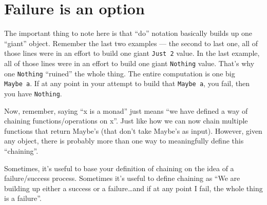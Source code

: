 \documentclass[]{article}
\begin{document}
\section{Failure is an option}\label{failure-is-an-option}

The important thing to note here is that ``do'' notation basically builds up one ``giant'' object.
Remember the last two examples --- the second to last one, all of those lines were in an effort to
build one giant \texttt{Just\ 2} value. In the last example, all of those lines were in an effort to
build one giant \texttt{Nothing} value. That's why one \texttt{Nothing} ``ruined'' the whole thing.
The entire computation is one big \texttt{Maybe\ a}. If at any point in your attempt to build that
\texttt{Maybe\ a}, you fail, then you have \texttt{Nothing}.

Now, remember, saying ``x is a monad'' just means ``we have defined a way of chaining
functions/operations on x''. Just like how we can now chain multiple functions that return Maybe's
(that don't take Maybe's as input). However, given any object, there is probably more than one way
to meaningfully define this ``chaining''.

Sometimes, it's useful to base your definition of chaining on the idea of a failure/success process.
Sometimes it's useful to define chaining as ``We are building up either a success or a
failure\ldots{}and if at any point I fail, the whole thing is a failure''.
\end{document}
